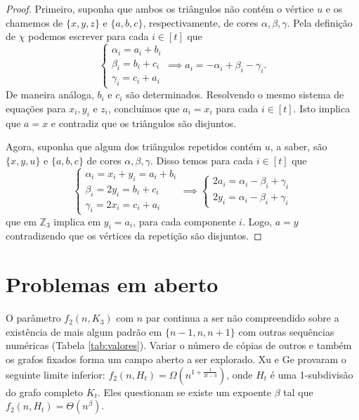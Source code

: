 \documentclass[12pt,a4paper]{book}
\def\ZZ{\mathds Z}
\def\ZZ{{\mathbb Z}}
\def\ZZ{{\mathbb Z}}
\begin{document}
\begin{proof}
        Primeiro, suponha que ambos os triângulos não contém o vértice $u$ e os chamemos de $\{x,y,z\}$ e $\{a,b,c\}$, respectivamente, de cores $\alpha, \beta, \gamma$. Pela definição de $\chi$ podemos escrever para cada $i \in [t]$ que
        \[
            \left\{\begin{matrix}
            \alpha_i = a_i +b_i\\ 
            \beta_i = b_i+c_i\\ 
            \gamma_i = c_i+a_i
            \end{matrix}\right.
            \implies a_i = -\alpha_i+\beta_i-\gamma_i.
        \]
        De maneira análoga, $b_i$ e $c_i$ são determinados. 
        Resolvendo o mesmo sistema de equações para $x_i, y_i$ e $z_i$,
        concluímos que $a_i = x_i$ para cada $i \in [t]$.
        Isto implica que $a = x$ e contradiz que os triângulos são disjuntos.
        
        Agora, suponha que algum dos triângulos repetidos contém $u$, a saber, são $\{x,y,u\}$ e $\{a,b,c\}$ de cores $\alpha, \beta, \gamma$. 
        Disso temos para cada $i \in [t]$ que
        \[
            \left\{\begin{matrix}
            \alpha_i = x_i+y_i = a_i +b_i\\ 
            \beta_i = 2y_i = b_i+c_i\\ 
            \gamma_i = 2x_i = c_i+a_i
            \end{matrix}\right.
            \implies 
            \left\{\begin{matrix}
            2a_i = \alpha_i - \beta_i + \gamma_i\\ 
            2y_i = \alpha_i - \beta_i + \gamma_i
            \end{matrix}\right.
        \]
        que em $\ZZ_3$ implica em $y_i = a_i$, para cada componente $i$. Logo, $a = y$ contradizendo que os vértices da repetição  são disjuntos.
    \end{proof}
    
    \section{Problemas em aberto}
\label{subsec:repeated-prob}

        O parâmetro $f_2(n, K_3)$ com $n$ par continua a ser não compreendido sobre a existência de mais algum padrão em $\{n-1,n,n+1\}$ com outras sequências numéricas (Tabela \ref{tab:valores}).
        Variar o número de cópias de outros e também os grafos fixados forma um campo aberto a ser explorado.
        Xu e Ge \cite{xu2022color} provaram o seguinte limite inferior: $f_2(n, H_t) = \Omega(n^{1+\frac{1}{2t-3}})$, onde $H_t$ é uma 1-subdivisão do grafo completo $K_t$. Eles questionam se existe um expoente $\beta$ tal que $f_2(n, H_t) = \Theta(n^\beta)$.
        
\end{document}
